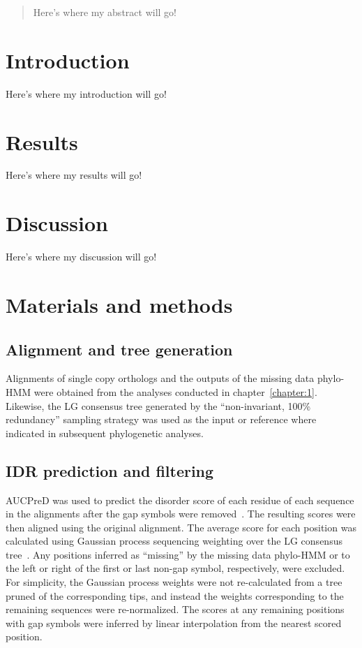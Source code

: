 \begin{abstract}
\noindent
Here's where my abstract will go!
\end{abstract}

\section{Introduction}
Here's where my introduction will go!

\section{Results}
Here's where my results will go!

\section{Discussion}
Here's where my discussion will go!

\section{Materials and methods}

\subsection{Alignment and tree generation}
Alignments of single copy orthologs and the outputs of the missing data phylo-HMM were obtained from the analyses conducted in chapter~\ref{chapter:1}. Likewise, the LG consensus tree generated by the ``non-invariant, 100\% redundancy'' sampling strategy was used as the input or reference where indicated in subsequent phylogenetic analyses.

\subsection{IDR prediction and filtering}
AUCPreD was used to predict the disorder score of each residue of each sequence in the alignments after the gap symbols were removed~\cite{Wang2016}. The resulting scores were then aligned using the original alignment. The average score for each position was calculated using Gaussian process sequencing weighting over the LG consensus tree~\cite{Altschul1989}. Any positions inferred as ``missing'' by the missing data phylo-HMM or to the left or right of the first or last non-gap symbol, respectively, were excluded. For simplicity, the Gaussian process weights were not re-calculated from a tree pruned of the corresponding tips, and instead the weights corresponding to the remaining sequences were re-normalized. The scores at any remaining positions with gap symbols were inferred by linear interpolation from the nearest scored position.

